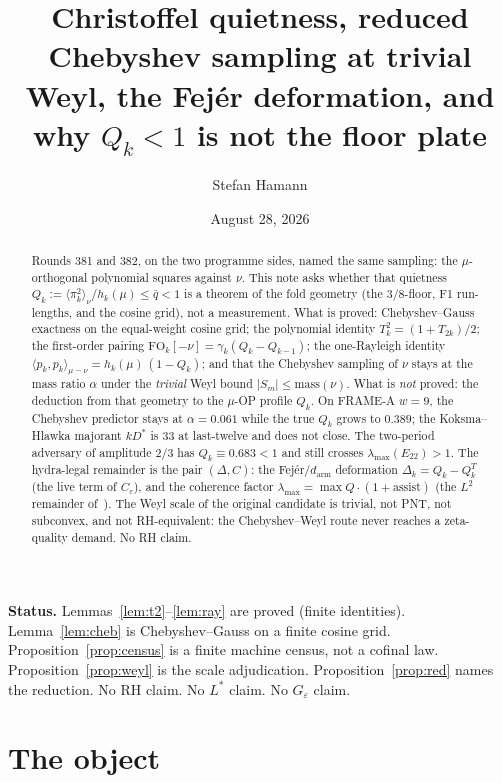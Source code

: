 \documentclass[11pt]{article}
\title{\bfseries Christoffel quietness, reduced\\[2mm]
\large Chebyshev sampling at trivial Weyl, the Fej\'er
deformation, and why $Q_k<1$ is not the floor plate}
\author{Stefan Hamann}
\date{August 28, 2026}
\theoremstyle{remark}
\begin{document}
\maketitle

\begin{abstract}\noindent
Rounds 381 and 382, on the two programme sides, named the same
sampling: the $\mu$-orthogonal polynomial squares against $\nu$.
This note asks whether that quietness
$Q_k:=\langle\pi_k^2\rangle_\nu/h_k(\mu)\le\bar q<1$
is a theorem of the fold geometry (the $3/8$-floor, F1 run-lengths,
and the cosine grid), not a measurement.
What is proved: Chebyshev--Gauss exactness on the equal-weight
cosine grid; the polynomial identity $T_k^2=(1+T_{2k})/2$;
the first-order pairing
$\mathrm{FO}_k[-\nu]=\gamma_k(Q_k-Q_{k-1})$;
the one-Rayleigh identity
$\langle p_k,p_k\rangle_{\mu-\nu}=h_k(\mu)\,(1-Q_k)$;
and that the Chebyshev sampling of $\nu$ stays at the mass
ratio $\alpha$ under the \emph{trivial} Weyl bound
$\lvert S_m\rvert\le\mathrm{mass}(\nu)$.
What is \emph{not} proved: the deduction from that geometry to
the $\mu$-OP profile $Q_k$.  On FRAME-A $w=9$, the Chebyshev
predictor stays at $\alpha=0.061$ while the true $Q_k$ grows to
$0.389$; the Koksma--Hlawka majorant $kD^*$ is $33$ at last-twelve
and does not close.  The two-period adversary of amplitude $2/3$
has $Q_k\equiv 0.683<1$ and still crosses $\lambda_{\max}(E_{22})>1$.
The hydra-legal remainder is the pair $(\Delta, C)$: the Fej\'er$/d_{\mathrm{arm}}$
deformation $\Delta_k=Q_k-Q_k^T$ (the live term of $C_\varepsilon$),
and the coherence factor $\lambda_{\max}=\max Q\cdot(1+\mathrm{assist})$
(the $L^2$ remainder of~\cite{r382}).
The Weyl scale of the original candidate is trivial, not PNT,
not subconvex, and not RH-equivalent: the Chebyshev--Weyl route
never reaches a zeta-quality demand.
No RH claim.
\end{abstract}

\medskip\noindent
\textbf{Status.}\enspace
Lemmas~\ref{lem:t2}--\ref{lem:ray} are proved (finite identities).
Lemma~\ref{lem:cheb} is Chebyshev--Gauss on a finite cosine grid.
Proposition~\ref{prop:census} is a finite machine census, not a
cofinal law.
Proposition~\ref{prop:weyl} is the scale adjudication.
Proposition~\ref{prop:red} names the reduction.
No RH claim.  No $L^*$ claim.  No $G_\varepsilon$ claim.

\section{The object}\label{sec:obj}
\end{document}
